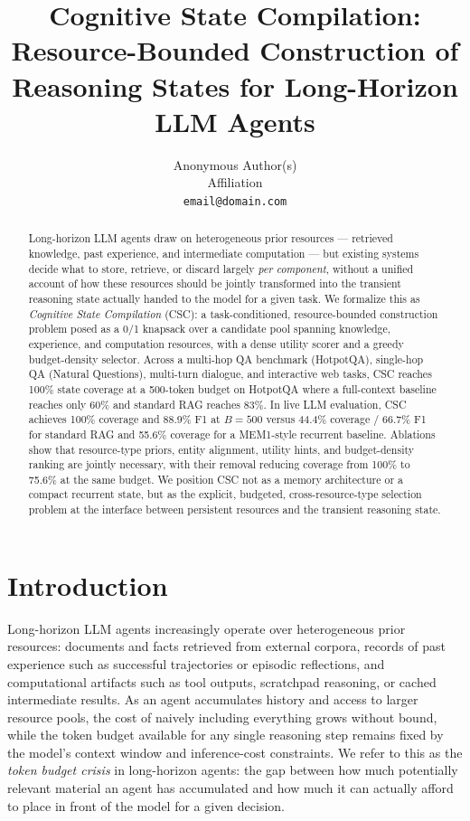\documentclass{article}
\title{Cognitive State Compilation: Resource-Bounded Construction of\\ Reasoning States for Long-Horizon LLM Agents}
\author{
  Anonymous Author(s) \\
  Affiliation \\
  \texttt{email@domain.com}
}
\begin{document}
\maketitle

\begin{abstract}
Long-horizon LLM agents draw on heterogeneous prior resources --- retrieved knowledge, past experience, and intermediate computation --- but existing systems decide what to store, retrieve, or discard largely \emph{per component}, without a unified account of how these resources should be jointly transformed into the transient reasoning state actually handed to the model for a given task. We formalize this as \emph{Cognitive State Compilation} (CSC): a task-conditioned, resource-bounded construction problem posed as a 0/1 knapsack over a candidate pool spanning knowledge, experience, and computation resources, with a dense utility scorer and a greedy budget-density selector. Across a multi-hop QA benchmark (HotpotQA), single-hop QA (Natural Questions), multi-turn dialogue, and interactive web tasks, CSC reaches 100\% state coverage at a 500-token budget on HotpotQA where a full-context baseline reaches only 60\% and standard RAG reaches 83\%. In live LLM evaluation, CSC achieves 100\% coverage and 88.9\% F1 at $B=500$ versus 44.4\% coverage / 66.7\% F1 for standard RAG and 55.6\% coverage for a MEM1-style recurrent baseline. Ablations show that resource-type priors, entity alignment, utility hints, and budget-density ranking are jointly necessary, with their removal reducing coverage from 100\% to 75.6\% at the same budget. We position CSC not as a memory architecture or a compact recurrent state, but as the explicit, budgeted, cross-resource-type selection problem at the interface between persistent resources and the transient reasoning state.
\end{abstract}

\section{Introduction}
\label{sec:intro}

Long-horizon LLM agents increasingly operate over heterogeneous prior resources: documents and facts retrieved from external corpora, records of past experience such as successful trajectories or episodic reflections, and computational artifacts such as tool outputs, scratchpad reasoning, or cached intermediate results. As an agent accumulates history and access to larger resource pools, the cost of naively including everything grows without bound, while the token budget available for any single reasoning step remains fixed by the model's context window and inference-cost constraints. We refer to this as the \emph{token budget crisis} in long-horizon agents: the gap between how much potentially relevant material an agent has accumulated and how much it can actually afford to place in front of the model for a given decision.
\end{document}
